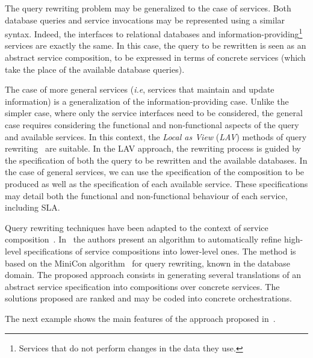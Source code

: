 The query rewriting problem may be generalized to the case of services.
Both database queries and service invocations may be represented using a similar syntax.
Indeed, the interfaces to relational databases and information-providing\footnote{Services that do not perform changes in the data they use.} services are exactly the same.
In this case, the query to be rewritten is seen as an abstract service composition, to be expressed in terms of concrete services (which take the place of the available database queries).

The case of more general services (\textit{i.e}, services that maintain and update information) is a generalization of the information-providing case.
Unlike the simpler case, where only the service interfaces need to be considered, the general case requires considering the functional and non-functional aspects of the query and available services.
In this context, the \textit{Local as View} (\textit{LAV}) methods of query rewriting~\cite{Levy2000} are suitable.
In the LAV approach, the rewriting process is guided by the specification of both the query to be rewritten and the available databases.
In the case of general services, we can use the specification of the composition to be produced as well as the specification of each available service.
These specifications may detail both the functional and non-functional behaviour of each service, including SLA.

Query rewriting techniques have been adapted to the context of service composition~\cite{BBM10,ZLC11,CostaAMR13}. 
In~\cite{CostaAMR13} the authors present an algorithm to automatically refine high-level specifications of service compositions into lower-level ones. 
The method is based on the MiniCon algorithm~\cite{PH01} for query rewriting,  known in the database domain.
The proposed approach consists in generating several translations of an abstract service specification into compositions
over concrete  services. 
The solutions proposed are ranked and may be coded into concrete orchestrations. 

The next example shows the main features of the approach proposed in~\cite{CostaAMR13}. 

